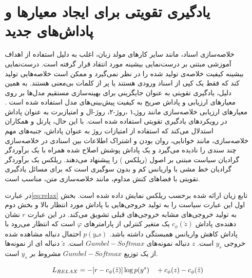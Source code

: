 \section{یادگیری تقویتی  برای ایجاد معیارها و پاداش‌های جدید}
	
	خلاصه‌سازی اسناد، مانند سایر کارهای مولد زبان،  اغلب به دلیل استفاده از اهداف آموزشی مبتنی بر  درست‌نمایی بیشینه
	 مورد انتقاد قرار گرفته است.
	درست‌نمایی بیشینه کیفیت خلاصه‌ی تولید شده را در نظر نمی‌گیرد و ممکن است خلاصه‌هایی تولید کند که فقط یک کپی از اسناد ورودی هستند یا پر از کلمات بی‌معنی هستند. به همین دلیل، یادگیری تقویتی به عنوان جایگزینی برای بهینه‌سازی مستقیم مدل‌ها بر روی معیارهای ارزیابی و پاداش صریح به کیفیت پیش‌بینی‌های مدل استفاده شده است	\cite{Parnell2022AMC}. 
	معیارهای ارزیابی خلاصه‌سازی مانند روژـ۱
،روژ-۲،
روژ-‌ال
	و امتیازبرت
	 به عنوان پاداش در رویکردهای یادگیری تقویتی استفاده شده است. با این حال، پارنل و همکاران  استدلال می‌کند که استفاده از امتیازات روژ به عنوان پاداش، جنبه‌های مهم خلاصه‌سازی، مانند خوانایی، روان بودن و اشتراک اطلاعات بین اسنادی در خلاصه‌سازی چند سندی را نادیده می‌گیرد و یک پاداش پوشش اصلاح شده همراه با یک برآوردگر گرادیان سیاست مبتنی بر اصول (ریلکس )	 
	  را پیشنهاد می‌دهند\cite{Parnell2022AMC, ALOMARI}.
	   ریلکس یک برآوردگر گرادیان خط مشی
	  با واریانس کم و بدون سوگیری
	     است که برای مسائل یادگیری تقویتی با فضاهای کنش مداوم، مانند خلاصه‌سازی متن، مناسب است\cite{Grathwohl2017BackpropagationTT}.
	     
	   در عبارت\ref {eq:relax} تابع زیان ارائه شده برحسب ریلکس نمایش داده شده است.
	  بخش اول این عبارت سیاست را به تولید خروجی‌هایی با پاداش مورد انتظار بالا و بخش دوم به تولید خروجی‌‌های مشابه خروجی‌های قبلی 
	  تشویق می‌کند.
  در این عبارت
	  $ r $
	  نشان دهنده‌ی پاداش 
	 $  c_\phi(\tilde{z}) $
	 یک متغیر کنترلی از پارامترهای $ φ $ است که انتظار می‌رود با پاداش کاهش واریانس همبستگی داشته باشد.
	$  p(yـs) $ 
	احتمال دنباله مشاهده شده خروجی $ y_s $ است.
	 $ z $
	  دنباله نمونه‌های $Gumbel-Softmax  $ است.
	 $ \tilde{z} $
	  دنباله ای از نمونه‌ها از یک توزیع $ Gumbel-Softmax $ مشروط بر $ y_s $ است.
	

	  \begin{equation}
	  \label{eq:relax}
	  L_\text{$ RELAX $} = -[r - c_\phi(\tilde{z})]   \log p(y^{s}) \quad + c_\phi(z) - c_\phi(\tilde{z})
	  \end{equation}
	
